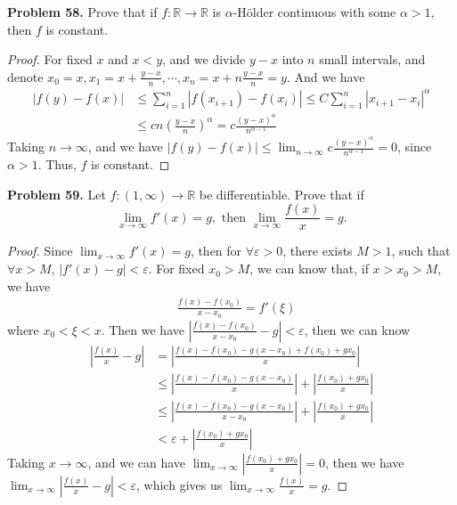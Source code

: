 \documentclass[12pt,leqno]{amsart}
\theoremstyle{definition}
\begin{document}
\noindent
{\bf Problem 58.}
Prove that if $f:\mathbb{R}\to\mathbb{R}$ is $\alpha$-H\"{o}lder continuous with some $\alpha>1$, then $f$ is constant.
\begin{proof}
For fixed $x$ and $x<y$, and we divide $y-x$ into $n$ small intervals, and denote $x_0=x, x_1=x+\frac{y-x}{n},\cdots, x_{n}=x+n\frac{y-x}{n}=y$. And we have 
\begin{align*}
    |f(y)-f(x)| &\leq \sum^{n}_{i=1}|f(x_{i+1})-f(x_i)|\leq C \sum^{n}_{i=1} |x_{i+1}-x_i|^\alpha \\
    & \leq c n \left(\frac{y-x}{n}\right)^\alpha = c \frac{(y-x)^\alpha}{n^{\alpha-1}}
\end{align*}
Taking $n\to\infty$, and we have $|f(y)-f(x)|\leq \lim_{n\to\infty}c \frac{(y-x)^\alpha}{n^{\alpha-1}} =0$, since $\alpha>1$. Thus, $f$ is constant.
\end{proof}

\medskip

\noindent
{\bf Problem 59.}
Let $f:(1,\infty)\to\mathbb{R}$ be differentiable. Prove that if
$$
\lim_{x\to\infty} f'(x) = g,\text{ then }\lim_{x\to\infty }\frac{f(x)}{x} = g.
$$
\begin{proof}
Since $\lim_{x\to\infty} f'(x) = g$, then for $\forall \varepsilon >0$, there exists $M>1$, such that $\forall x>M$, $|f'(x)-g |<\varepsilon$. For fixed $x_0>M$, we can know that, if $x>x_0>M$, we have 
\begin{align*}
    &\frac{f(x)-f(x_0)}{x-x_0} = f'(\xi) 
\end{align*}
where $x_0<\xi<x$. Then we have $\left|\frac{f(x)-f(x_0)}{x-x_0} - g\right|<\varepsilon$, then we can know 
\begin{align*}
    \left|\frac{f(x)}{x}-g\right| & = \left|\frac{f(x)-f(x_0)-g(x-x_0)+f(x_0)+gx_0}{x}\right|\\
    & \leq \left|\frac{f(x)-f(x_0)-g(x-x_0)}{x}\right| + \left|\frac{f(x_0)+gx_0}{x}\right| \\
    & \leq \left|\frac{f(x)-f(x_0)-g(x-x_0)}{x-x_0}\right| + \left|\frac{f(x_0)+gx_0}{x}\right| \\
    & <  \varepsilon + \left|\frac{f(x_0)+gx_0}{x}\right|
\end{align*}
Taking $x\to\infty$, and we can have $\lim_{x\to\infty}\left|\frac{f(x_0)+gx_0}{x}\right| = 0$, then we have $\lim_{x\to\infty}\left|\frac{f(x)}{x}-g\right|<\varepsilon$, which gives us $\lim_{x\to\infty }\frac{f(x)}{x} = g$.
\end{proof}

\medskip
\end{document}
